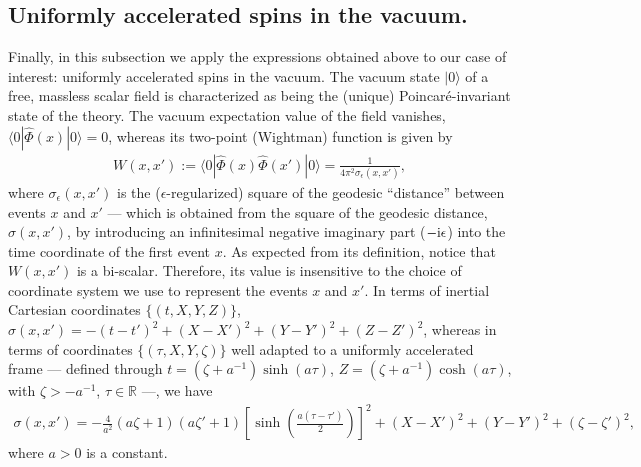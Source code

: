 \documentclass[]{nature}
\makeatletter
\renewenvironment{figure}
               {\@float{figure}}
               {\end@float}
\makeatother
\begin{document}
{\subsection{Uniformly accelerated spins in the vacuum.}
\label{sec:uas}

Finally, in this subsection we apply the  expressions obtained above to our case of interest: uniformly accelerated spins in the vacuum.
The vacuum state  $|0\rangle$ of a free, massless scalar field is characterized as being the (unique) Poincar\'e-invariant state of the theory.
The vacuum  expectation value of the field vanishes,  $\langle 0|\hat\Phi(x)|0\rangle = 0$, whereas
its two-point (Wightman) function is given by 
\begin{eqnarray}
W(x,x') := \langle 0 |\hat \Phi(x) \hat \Phi(x')|0\rangle =
\frac{1}{4 \pi^2\sigma_\epsilon(x,x')},
\label{W}
\end{eqnarray} 
where 
$\sigma_\epsilon(x,x')$ is the ($\epsilon$-regularized) square of the geodesic ``distance''
between events $x$ and $x'$ --- which is obtained from the square of the geodesic distance, $\sigma (x,x')$, by
introducing an infinitesimal  negative imaginary part ($-{\rm i}\epsilon$) into the time coordinate of the first event $x$.
As expected from  its definition, notice that $W(x,x')$ is a bi-scalar. Therefore, its value is insensitive to the choice of coordinate 
system we use to represent
the events $x$ and $x'$.
In terms of inertial Cartesian coordinates $\{(t,X,Y,Z)\}$, $\sigma(x,x') = -(t-t')^2+(X-X')^2 +(Y-Y')^2+(Z-Z')^2$, whereas in terms of 
coordinates $\{(\tau,X,Y,\zeta)\}$ well adapted to
a uniformly accelerated frame --- 
defined through
 $t = (\zeta + a^{-1}) \sinh(a\tau)$, $Z = (\zeta + a^{-1}) \cosh(a\tau)$, with $\zeta > - a^{-1}$, $\tau \in {\mathbb R}$ ---, we have
\begin{eqnarray}
\sigma(x,x') = -\frac{4}{a^2} (a\zeta+1)(a\zeta'+1) \left[\sinh\left(\frac{a(\tau-\tau')}{2}\right)\right]^2
+ (X-X')^2+(Y-Y')^2 +(\zeta - \zeta')^2,
\label{sigma2}
\end{eqnarray}
where $a>0$ is a constant.
}
\end{document}
